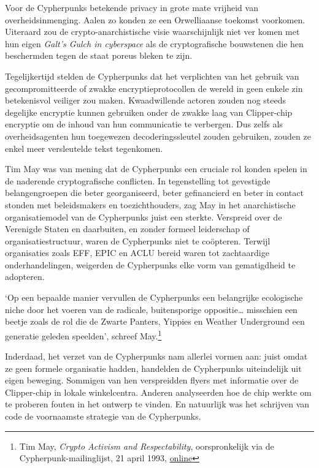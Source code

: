 \documentclass[
  a5paper,
  smalldemyvopaper,11pt,twoside,onecolumn,openright,extrafontsizes,
hidelinks]{memoir}
\begin{document}
Voor de Cypherpunks betekende privacy in grote mate vrijheid van
overheidsinmenging. Aalen zo konden ze een Orwelliaanse toekomst
voorkomen. Uiteraard zou de crypto-anarchistische visie waarschijnlijk
niet ver komen met hun eigen \emph{Galt's Gulch in cyberspace} als de
cryptografische bouwstenen die hen beschermden tegen de staat poreus
bleken te zijn.

Tegelijkertijd stelden de Cypherpunks dat het verplichten van het
gebruik van gecompromitteerde of zwakke encryptieprotocollen de wereld
in geen enkele zin betekenisvol veiliger zou maken. Kwaadwillende
actoren zouden nog steeds degelijke encryptie kunnen gebruiken onder de
zwakke laag van Clipper-chip encryptie om de inhoud van hun communicatie
te verbergen. Dus zelfs als overheidsagenten hun toegewezen
decoderingssleutel zouden gebruiken, zouden ze enkel meer versleutelde
tekst tegenkomen.

Tim May was van mening dat de Cypherpunks een cruciale rol konden spelen
in de naderende cryptografische conflicten. In tegenstelling tot
gevestigde belangengroepen die beter georganiseerd, beter gefinancierd
en beter in contact stonden met beleidsmakers en toezichthouders, zag
May in het anarchistische organisatiemodel van de Cypherpunks juist een
sterkte. Verspreid over de Verenigde Staten en daarbuiten, en zonder
formeel leiderschap of organisatiestructuur, waren de Cypherpunks niet
te coöpteren. Terwijl organisaties zoals EFF, EPIC en ACLU bereid waren
tot zachtaardige onderhandelingen, weigerden de Cypherpunks elke vorm
van gematigdheid te adopteren.

`Op een bepaalde manier vervullen de Cypherpunks een belangrijke
ecologische niche door het voeren van de radicale, buitensporige
oppositie\ldots{} misschien een beetje zoals de rol die de Zwarte
Panters, Yippies en Weather Underground een generatie geleden speelden',
schreef May.\footnote{Tim May, \emph{Crypto Activism and
  Respectability}, oorspronkelijk via de Cypherpunk-mailinglijst, 21
  april 1993,
  \href{https://cypherpunks.venona.com/date/1993/04/msg00400.html}{online}}

Inderdaad, het verzet van de Cypherpunks nam allerlei vormen aan: juist
omdat ze geen formele organisatie hadden, handelden de Cypherpunks
uiteindelijk uit eigen beweging. Sommigen van hen verspreidden flyers
met informatie over de Clipper-chip in lokale winkelcentra. Anderen
analyseerden hoe de chip werkte om te proberen fouten in het ontwerp te
vinden. En natuurlijk was het schrijven van code de voornaamste
strategie van de Cypherpunks.
\end{document}

